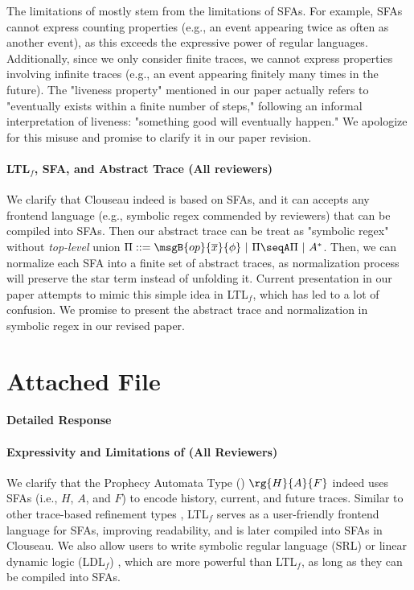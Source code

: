 The limitations of \PAT mostly stem from the limitations of SFAs. For
example, SFAs cannot express counting properties (e.g., an event
appearing twice as often as another event), as this exceeds the
expressive power of regular languages. Additionally, since we only
consider finite traces, we cannot express properties involving
infinite traces (e.g., an event appearing finitely many times in the
future). The "liveness property" mentioned in our paper actually
refers to "eventually exists within a finite number of steps,"
following an informal interpretation of liveness: "something good will
eventually happen." We apologize for this misuse and promise to
clarify it in our paper revision.

\paragraph{LTL$_f$, SFA, and Abstract Trace (All reviewers)} We clarify that {\sf Clouseau} indeed is based on SFAs, and it can accepts any frontend language (e.g., symbolic regex commended by reviewers) that can be compiled into SFAs. Then our abstract trace can be treat as "symbolic regex" without \emph{top-level} union $\Pi ::= \msgB{op}{\overline{x}}{\phi} ~|~ \Pi \seqA \Pi ~|~ A^*$. Then, we can normalize each SFA into a finite set of abstract traces, as normalization process will preserve the star term instead of unfolding it. Current presentation in our paper attempts to mimic this simple idea in LTL$_f$, which has led to a lot of confusion. We promise to present the abstract trace and normalization in symbolic regex in our revised paper.



\section{Attached File}

\paragraph{Detailed Response}

\paragraph{Expressivity and Limitations of \PAT (All Reviewers)}

We clarify that the Prophecy Automata Type (\PAT) \(\rg{H}{A}{F}\) indeed uses SFAs (i.e., \(H\), \(A\), and \(F\)) to encode history, current, and future traces. Similar to other trace-based refinement types \cite{HAT}, LTL\(_f\) serves as a user-friendly frontend language for SFAs, improving readability, and is later compiled into SFAs in {\sf Clouseau}. We also allow users to write symbolic regular language (SRL) or linear dynamic logic (LDL\(_f\)) \cite{LTLf}, which are more powerful than LTL\(_f\), as long as they can be compiled into SFAs.

